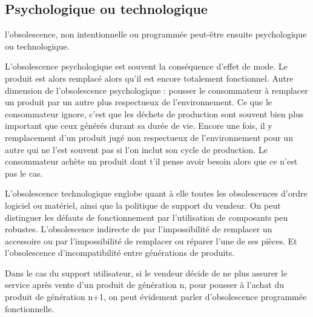\subsection{Psychologique ou technologique}

l’obsolescence, non intentionnelle ou programmée peut-être ensuite psychologique ou technologique. 

L’obsolescence psychologique est souvent la conséquence d’effet de mode. Le produit est alors remplacé alors qu’il est encore totalement fonctionnel. Autre dimension de l’obsolescence psychologique : pousser le consommateur à remplacer un produit par un autre plus respectueux de l’environnement.
Ce que le consommateur ignore, c’est que les déchets de production sont souvent bien plus important que ceux générés durant sa durée de vie. Encore une fois, il y remplacement d’un produit jugé non respectueux de l’environnement pour un autre qui ne l’est souvent pas si l’on inclut son cycle de production. Le consommateur achète un produit dont t'il pense avoir besoin alors que ce n'est pas le cas.

L’obsolescence technologique englobe quant à elle toutes les obsolescences d’ordre logiciel ou matériel, ainsi que la politique de support du vendeur. On peut distinguer les défauts de fonctionnement par l’utilisation de composants peu robustes. L’obsolescence indirecte de par l'impossibilité de remplacer un accessoire ou par l’impossibilité de remplacer ou réparer l’une de ses pièces. Et l’obsolescence d’incompatibilité entre générations de produits.

Dans le cas du support utilisateur, si le vendeur décide de ne plus assurer le service après vente d’un produit de génération n, pour pousser à l’achat du produit de génération n+1, on peut évidement parler d'obsolescence programmée fonctionnelle.